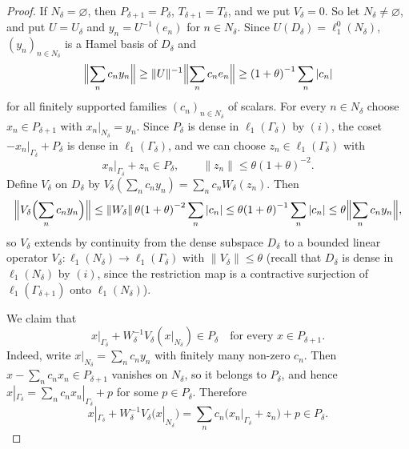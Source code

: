 \documentclass[12pt]{article}
\newcommand{\lo}[1]{\ell_1^0(#1)}
\newcommand{\ellone}[1]{\ell_1(#1)}
\newcommand{\norm}[1]{\lVert #1\rVert}
\begin{document}
\begin{proof}
    If $N_\delta=\varnothing$, then $P_{\delta+1}=P_\delta$,
    $T_{\delta+1}=T_\delta$, and we put $V_\delta=0$. So let
    $N_\delta\neq\varnothing$, and put $U=U_\delta$ and $y_n=U^{-1}(e_n)$ for
    $n\in N_\delta$. Since $U(D_\delta)=\lo{N_\delta}$, ${(y_n)}_{n\in N_\delta}$ is a Hamel basis of
    $D_\delta$ and
    \[
    \Bigl\lVert\sum_{n}c_ny_n\Bigr\rVert\geq\norm{U}^{-1}\Bigl\lVert\sum_n c_ne_n\Bigr\rVert
    \geq{(1+\theta)}^{-1}\sum_n|c_n|
    \]
    for all finitely supported families ${(c_n)}_{n\in N_\delta}$ of scalars.
    For every $n\in N_\delta$ choose $x_n\in P_{\delta+1}$ with
    $x_n|_{N_\delta}=y_n$. Since $P_\delta$ is dense in $\ellone{\Gamma_\delta}$
    by $(i)$, the coset $-x_n|_{\Gamma_\delta}+P_\delta$ is dense in
    $\ellone{\Gamma_\delta}$, and we can choose $z_n\in\ellone{\Gamma_\delta}$ with
    \[
    x_n|_{\Gamma_\delta}+z_n\in P_\delta,\qquad\norm{z_n}\leq\theta{(1+\theta)}^{-2}.
    \]
    Define $V_\delta$ on $D_\delta$ by $V_\delta(\sum_n c_ny_n)=\sum_n c_nW_\delta(z_n)$.
    Then
    \[
    \Bigl\lVert V_\delta\Bigl(\sum_n c_ny_n\Bigr)\Bigr\rVert
    \leq\norm{W_\delta}\,\theta{(1+\theta)}^{-2}\sum_n|c_n|
    \leq\theta{(1+\theta)}^{-1}\sum_n|c_n|
    \leq\theta\Bigl\lVert\sum_n c_ny_n\Bigr\rVert,
    \]
    so $V_\delta$ extends by continuity from the dense subspace $D_\delta$ to
    a bounded linear operator $V_\delta:\ellone{N_\delta}\to\ellone{\Gamma_\delta}$
    with $\norm{V_\delta}\leq\theta$ (recall that $D_\delta$ is dense in
    $\ellone{N_\delta}$ by $(i)$, since the restriction map is a contractive
    surjection of $\ellone{\Gamma_{\delta+1}}$ onto $\ellone{N_\delta}$).

    We claim that
    \begin{equation}\label{KeyInclusion}
    x|_{\Gamma_\delta}+W_\delta^{-1}V_\delta(x|_{N_\delta})\in P_\delta
    \quad\text{for every }x\in P_{\delta+1}.
    \end{equation}
    Indeed, write $x|_{N_\delta}=\sum_n c_ny_n$ with finitely many non-zero
    $c_n$. Then $x-\sum_n c_nx_n\in P_{\delta+1}$ vanishes on $N_\delta$, so it
    belongs to $P_\delta$, and hence
    $x|_{\Gamma_\delta}=\sum_n c_nx_n|_{\Gamma_\delta}+p$ for some $p\in P_\delta$.
    Therefore
    \[
    x|_{\Gamma_\delta}+W_\delta^{-1}V_\delta(x|_{N_\delta})
    =\sum_n c_n\bigl(x_n|_{\Gamma_\delta}+z_n\bigr)+p\in P_\delta.
    \]


\end{proof}
\end{document}
